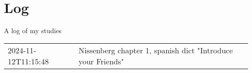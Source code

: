 \chapter{Log}

    A log of my studies

    \begin{tabular}{l|l}
        2024-11-12T11:15:48 & Nissenberg chapter 1, spanish dict "Introduce your Friends"
    \end{tabular}